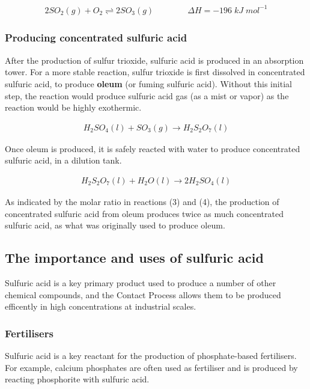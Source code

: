 \documentclass[12pt, a4paper]{article}
\begin{document}
\begin{align}
	2SO_{2}(g) + O_{2} \rightleftharpoons 2SO_{3}(g) \qquad \qquad \Delta H = -196 \; kJ \; mol^{-1}
\end{align}

\pagebreak






\subsubsection{Producing concentrated sulfuric acid}

After the production of sulfur trioxide, sulfuric acid is produced in an absorption tower. For a more stable reaction, sulfur trioxide is first dissolved in concentrated sulfuric acid, to produce \textbf{oleum} (or fuming sulfuric acid). Without this initial step, the reaction would produce sulfuric acid gas (as a mist or vapor) as the reaction would be highly exothermic.

\begin{align}
	H_{2}SO_{4}(l) + SO_{3}(g) \rightarrow H_{2}S_{2}O_{7}(l)
\end{align}

Once oleum is produced, it is safely reacted with water to produce concentrated sulfuric acid, in a dilution tank.

\begin{align}
	H_{2}S_{2}O_{7}(l) + H_{2}O(l) \rightarrow 2H_{2}SO_{4}(l)
\end{align}

As indicated by the molar ratio in reactions (3) and (4), the production of concentrated sulfuric acid from oleum produces twice as much concentrated sulfuric acid, as what was originally used to produce oleum.






\subsection{The importance and uses of sulfuric acid}

Sulfuric acid is a key primary product used to produce a number of other chemical compounds, and the Contact Process allows them to be produced efficently in high concentrations at industrial scales. 

\subsubsection{Fertilisers}
Sulfuric acid is a key reactant for the production of phosphate-based fertilisers. For example, calcium phosphates are often used as fertiliser and is produced by reacting phosphorite with sulfuric acid.
\end{document}
